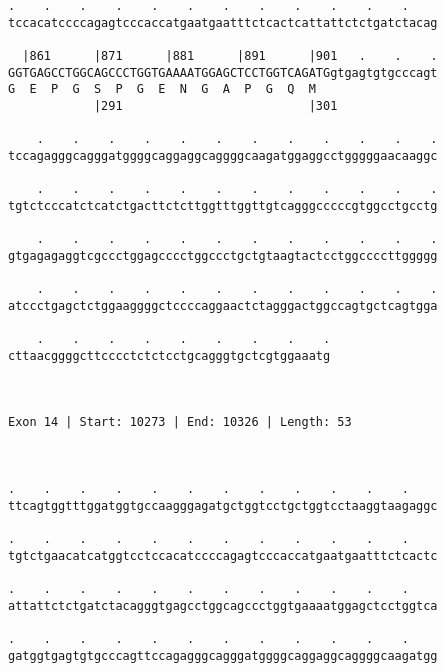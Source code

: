 \documentclass{article}
\begin{document}
\begin{Verbatim}
.    .    .    .    .    .    .    .    .    .    .    .    
tccacatccccagagtcccaccatgaatgaatttctcactcattattctctgatctacag
                                                            
  |861      |871      |881      |891      |901   .    .    .
GGTGAGCCTGGCAGCCCTGGTGAAAATGGAGCTCCTGGTCAGATGgtgagtgtgcccagt
G  E  P  G  S  P  G  E  N  G  A  P  G  Q  M                 
            |291                          |301              
  
    .    .    .    .    .    .    .    .    .    .    .    .
tccagagggcagggatggggcaggaggcaggggcaagatggaggcctgggggaacaaggc
                                                            
    .    .    .    .    .    .    .    .    .    .    .    .
tgtctcccatctcatctgacttctcttggtttggttgtcagggcccccgtggcctgcctg
                                                            
    .    .    .    .    .    .    .    .    .    .    .    .
gtgagagaggtcgccctggagcccctggccctgctgtaagtactcctggccccttggggg
                                                            
    .    .    .    .    .    .    .    .    .    .    .    .
atccctgagctctggaaggggctccccaggaactctagggactggccagtgctcagtgga
                                                            
    .    .    .    .    .    .    .    .    .
cttaacggggcttcccctctctcctgcagggtgctcgtggaaatg
                                             
                                             
 
Exon 14 | Start: 10273 | End: 10326 | Length: 53



.    .    .    .    .    .    .    .    .    .    .    .    
ttcagtggtttggatggtgccaagggagatgctggtcctgctggtcctaaggtaagaggc
                                                            
.    .    .    .    .    .    .    .    .    .    .    .    
tgtctgaacatcatggtcctccacatccccagagtcccaccatgaatgaatttctcactc
                                                            
.    .    .    .    .    .    .    .    .    .    .    .    
attattctctgatctacagggtgagcctggcagccctggtgaaaatggagctcctggtca
                                                            
.    .    .    .    .    .    .    .    .    .    .    .    
gatggtgagtgtgcccagttccagagggcagggatggggcaggaggcaggggcaagatgg
                                                            

\end{Verbatim}
\end{document}
